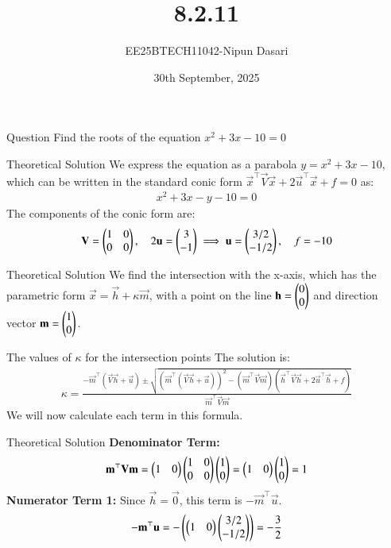 \documentclass{beamer}
\title{8.2.11}
\date{30th September, 2025}
\author{EE25BTECH11042-Nipun Dasari}
\begin{document}
	
	\frame{\titlepage}
	\begin{frame}{Question}
	Find the roots of the equation $x^2 + 3x - 10 = 0$ 
	\end{frame}
	
	\begin{frame}{Theoretical Solution}
	We express the equation as a parabola $y = x^2 + 3x - 10$, which can be written in the standard conic form $\vec{x}^\top\vec{V}\vec{x} + 2\vec{u}^\top\vec{x} + f = 0$ as:
	\begin{align}
		x^2 + 3x - y - 10 = 0
	\end{align}
	The components of the conic form are:
	\begin{align}
		\mathbf{V} = \begin{pmatrix}1&0\\0&0\end{pmatrix}, \quad 2\mathbf{u} = \begin{pmatrix}3\\-1\end{pmatrix} \implies \mathbf{u} = \begin{pmatrix}3/2\\-1/2\end{pmatrix}, \quad f = -10
	\end{align}
	\end{frame}
	
	\begin{frame}{Theoretical Solution}
		We find the intersection with the x-axis, which has the parametric form $\vec{x} = \vec{h} + \kappa\vec{m}$, with a point on the line $\mathbf{h} = \begin{pmatrix}0\\0\end{pmatrix}$ and direction vector $\mathbf{m} = \begin{pmatrix}1\\0\end{pmatrix}$.
		
		The values of $\kappa$ for the intersection points  The solution is:
		\begin{align}
			\kappa = \frac{-\vec{m}^\top(\vec{V}\vec{h} + \vec{u}) \pm \sqrt{(\vec{m}^\top(\vec{V}\vec{h}+\vec{u}))^2 - (\vec{m}^\top\vec{V}\vec{m})(\vec{h}^\top\vec{V}\vec{h} + 2\vec{u}^\top\vec{h} + f)}}{\vec{m}^\top\vec{V}\vec{m}}
		\end{align}
		We will now calculate each term in this formula.
	\end{frame}
	
	\begin{frame}{Theoretical Solution}
		\textbf{Denominator Term:}
		\begin{align}
			\mathbf{m}^\top\mathbf{V}\mathbf{m} = \begin{pmatrix}1 & 0\end{pmatrix}\begin{pmatrix}1&0\\0&0\end{pmatrix}\begin{pmatrix}1\\0\end{pmatrix} = \begin{pmatrix}1 & 0\end{pmatrix}\begin{pmatrix}1\\0\end{pmatrix} = 1
		\end{align}
		\textbf{Numerator Term 1:} Since $\vec{h} = \vec{0}$, this term is $-\vec{m}^\top\vec{u}$.
		\begin{align}
			-\mathbf{m}^\top\mathbf{u} = -\left(\begin{pmatrix}1 & 0\end{pmatrix}\begin{pmatrix}3/2\\-1/2\end{pmatrix}\right) = -\frac{3}{2}
		\end{align}
	\end{frame}
	
\end{document}
